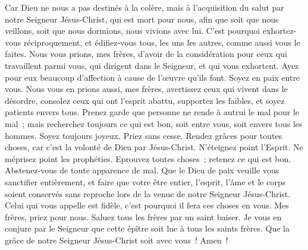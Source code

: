 \begin{multicols}{2}
Car Dieu ne nous a pas destinés à la colère, mais à l'acquisition du salut par notre Seigneur Jésus-Christ,
qui est mort pour nous, afin que soit que nous veillons, soit que nous dormions, nous vivions avec lui.
C'est pourquoi exhortez-vous réciproquement, et édifiez-vous tous, les uns les autres, comme aussi vous le faites.
Nous vous prions, mes frères, d'avoir de la considération pour ceux qui travaillent parmi vous, qui dirigent dans le Seigneur, et qui vous exhortent.
Ayez pour eux beaucoup d'affection à cause de l'œuvre qu'ils font. Soyez en paix entre vous.
Nous vous en prions aussi, mes frères, avertissez ceux qui vivent dans le désordre, consolez ceux qui ont l'esprit abattu, supportez les faibles, et soyez patients envers tous.
Prenez garde que personne ne rende à autrui le mal pour le mal~; mais recherchez toujours ce qui est bon, soit entre vous, soit envers tous les hommes.
Soyez toujours joyeux.
Priez sans cesse.
Rendez grâces pour toutes choses, car c'est la volonté de Dieu par Jésus-Christ.
N'éteignez point l'Esprit.
Ne méprisez point les prophéties.
Eprouvez toutes choses~; retenez ce qui est bon.
Abstenez-vous de toute apparence de mal.
Que le Dieu de paix veuille vous sanctifier entièrement, et faire que votre être entier, l'esprit, l'âme et le corps soient conservés sans reproche lors de la venue de notre Seigneur Jésus-Christ.
Celui qui vous appelle est fidèle, c'est pourquoi il fera ces choses en vous.
Mes frères, priez pour nous.
Saluez tous les frères par un saint baiser.
Je vous en conjure par le Seigneur que cette épître soit lue à tous les saints frères.
Que la grâce de notre Seigneur Jésus-Christ soit avec vous~! Amen~!
\PPE{}
\end{multicols}
